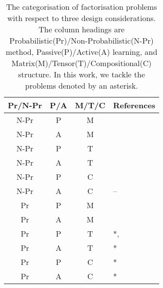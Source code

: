 
\begin{table}[t]
\centering
\caption{\label{tbl:relatedwork}The categorisation of factorisation problems with respect to 
three design considerations. The column headings are Probabilistic(Pr)/Non-Probabilistic(N-Pr) method, Passive(P)/Active(A) learning, and Matrix(M)/Tensor(T)/Compositional(C) structure. In this work, we tackle the problems denoted by an asterisk.}
\vskip 0.15in
\begin{tabular}{c c c l}
Pr/N-Pr & P/A & M/T/C & References	\\ \hline \hline

N-Pr & P & M & \cite{lee1999learning}\\ \hline
N-Pr & A & M & \cite{ruchansky2015matrix}\\  \hline

N-Pr & P & T& \cite{nickel2011three}\cite{kolda2009tensor}\\ \hline
N-Pr & A & T & \cite{kajino2015active} \\  \hline
N-Pr & P & C & \cite{Neelakantan2015}\cite{guu2015traversing}\\ \hline
N-Pr & A & C & -- \\ \hline
Pr & P & M & \cite{mnih2007probabilistic}\\ \hline
Pr & A & M&  \cite{kawale2015efficient}\cite{sutherland2013active}\\ \hline

Pr & P & T& *, \cite{xiong2010temporal}\cite{schmidt2009probabilistic} \\ \hline
Pr & A & T & * \\ \hline
Pr & P & C & * \\ \hline
Pr & A & C & *
\end{tabular}
\end{table}